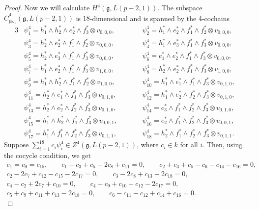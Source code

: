 \documentclass[pdftex]{sigma}%
\numberwithin{equation}{section}
\begin{document}
\begin{proof}
Now we will calculate $H^4(\mathfrak{g},L(p-2,1))$. The subspace $\overline{C}^4_{p\omega_1}(\mathfrak{g},L(p-2,1))$ is $18$-dimensional and is spanned by the $4$-cochains
\begin{alignat*}{3}
&\psi_1^4=h_1^*\wedge h_2^*\wedge e_2^*\wedge f_3^*\otimes v_{0,0,0},\qquad&&
\psi_2^4=h_1^*\wedge e_2^*\wedge f_1^*\wedge f_2^*\otimes v_{0,0,0},&
\\
&\psi_3^4=h_2^*\wedge e_2^*\wedge f_1^*\wedge f_2^*\otimes v_{0,0,0},\qquad&&
\psi_4^4=h_1^*\wedge e_3^*\wedge f_1^*\wedge f_3^*\otimes v_{0,0,0},&
\\
&\psi_5^4=h_2^*\wedge e_3^*\wedge f_1^*\wedge f_3^*\otimes v_{0,0,0},\qquad&&
\psi_6^4=e_1^*\wedge e_2^*\wedge f_1^*\wedge f_3^*\otimes v_{0,0,0},&
\\
&\psi_7^4=h_1^*\wedge e_2^*\wedge f_1^*\wedge f_3^*\otimes v_{1,0,0},\qquad&&
\psi_8^4=h_2^*\wedge e_2^*\wedge f_1^*\wedge f_3^*\otimes v_{1,0,0},&
\\
&\psi_9^4=h_1^*\wedge h_2^*\wedge f_1^*\wedge f_2^*\otimes v_{1,0,0},\qquad&&
\psi_{10}^4=h_1^*\wedge e_1^*\wedge f_1^*\wedge f_3^*\otimes v_{0,1,0},&
\\
&\psi_{11}^4=h_2^*\wedge e_1^*\wedge f_1^*\wedge f_3^*\otimes v_{0,1,0},\qquad&&
\psi_{12}^4=h_1^*\wedge e_2^*\wedge f_2^*\wedge f_3^*\otimes v_{0,1,0},&
\\
&\psi_{13}^4=h_2^*\wedge e_2^*\wedge f_2^*\wedge f_3^*\otimes v_{0,1,0},\qquad&&
\psi_{14}^4=e_3^*\wedge f_1^*\wedge f_2^*\wedge f_3^*\otimes v_{0,1,0},&
\\
&\psi_{15}^4=h_1^*\wedge h_2^*\wedge f_1^*\wedge f_3^*\otimes v_{0,0,1},\qquad&&
\psi_{16}^4=e_2^*\wedge f_1^*\wedge f_2^*\wedge f_3^*\otimes v_{0,0,1},&
\\
&\psi_{17}^4=h_1^*\wedge f_1^*\wedge f_2^*\wedge f_3^*\otimes v_{0,1,1},\qquad&&
\psi_{18}^4=h_2^*\wedge f_1^*\wedge f_2^*\wedge f_3^*\otimes v_{0,1,1}.&
\end{alignat*}
Suppose $\sum_{i=1}^{18}c_i\psi_i^4\in Z^4(\mathfrak{g},L(p-2,1))$, where $c_i\in k$ for all $i$. Then, using the cocycle condition, we get
\begin{gather*}
c_1=c_9=c_{15},
\qquad
c_1-c_3+c_5+2c_8+c_{11}=0,
\qquad
c_2+c_3+c_5-c_6-c_{14}-c_{16}=0,
\\
c_2-2c_7+c_{12}-c_{15}-2c_{17}=0,
\qquad
c_3-2c_8+c_{13}-2c_{18}=0,
\\
c_4-c_2+2c_7+c_{10}=0,
\qquad
c_4-c_9+c_{10}+c_{12}-2c_{17}=0,
\\
c_5+c_9+c_{11}+c_{13}-2c_{18}=0,
\qquad
c_6-c_{11}-c_{12}+c_{14}+c_{16}=0.

\end{gather*}
\end{proof}
\end{document}
